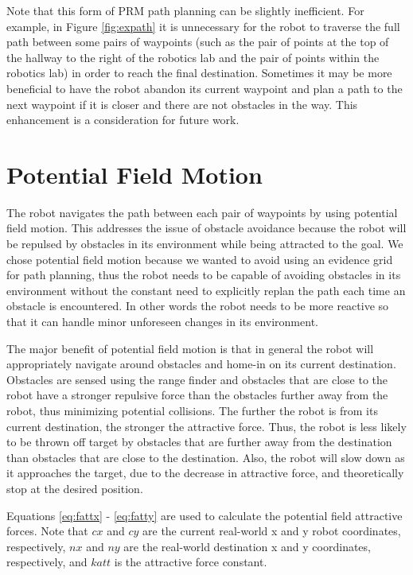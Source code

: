 \documentclass[11pt]{article}
\begin{document}
Note that this form of PRM path planning can be slightly inefficient. For example, in Figure \ref{fig:expath} it is unnecessary for the robot to traverse the full path between some pairs of waypoints (such as the pair of points at the top of the hallway to the right of the robotics lab and the pair of points within the robotics lab) in order to reach the final destination. Sometimes it may be more beneficial to have the robot abandon its current waypoint and plan a path to the next waypoint if it is closer and there are not obstacles in the way. This enhancement is a consideration for future work. 


\section{Potential Field Motion}
\label{sec:potential}

The robot navigates the path between each pair of waypoints by using potential field motion. This addresses the issue of obstacle avoidance because the robot will be repulsed by obstacles in its environment while being attracted to the goal. We chose potential field motion because we wanted to avoid using an evidence grid for path planning, thus the robot needs to be capable of avoiding obstacles in its environment without the constant need to explicitly replan the path each time an obstacle is encountered. In other words the robot needs to be more reactive so that it can handle minor unforeseen changes in its environment.

The major benefit of potential field motion is that in general the robot will appropriately navigate around obstacles and home-in on its current destination. Obstacles are sensed using the range finder and obstacles that are close to the robot have a stronger repulsive force than the obstacles further away from the robot, thus minimizing potential collisions. The further the robot is from its current destination, the stronger the attractive force. Thus, the robot is less likely to be thrown off target by obstacles that are further away from the destination than obstacles that are close to the destination. Also, the robot will slow down as it approaches the target, due to the decrease in attractive force, and theoretically stop at the desired position. 

Equations \ref{eq:fattx} - \ref{eq:fatty} are used to calculate the potential field attractive forces. Note that $cx$ and $cy$ are the current real-world x and y robot coordinates, respectively, $nx$ and $ny$ are the real-world destination x and y coordinates, respectively, and $katt$ is the attractive force constant.
\end{document}
